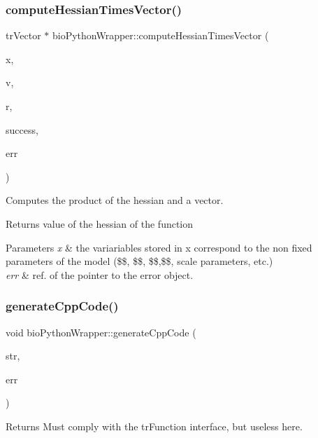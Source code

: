 \subsubsection{\texorpdfstring{compute\+Hessian\+Times\+Vector()}{computeHessianTimesVector()}}
{\footnotesize\ttfamily tr\+Vector $\ast$ bio\+Python\+Wrapper\+::compute\+Hessian\+Times\+Vector (\begin{DoxyParamCaption}\item[{tr\+Vector $\ast$}]{x,  }\item[{const tr\+Vector $\ast$}]{v,  }\item[{tr\+Vector $\ast$}]{r,  }\item[{pat\+Boolean $\ast$}]{success,  }\item[{pat\+Error $\ast$\&}]{err }\end{DoxyParamCaption})}

Computes the product of the hessian and a vector. \begin{DoxyReturn}{Returns}
value of the hessian of the function 
\end{DoxyReturn}

\begin{DoxyParams}{Parameters}
{\em x} & the variariables stored in x correspond to the non fixed parameters of the model (\$\$, \$\$, \$\$,\$\$, scale parameters, etc.) \\
\hline
{\em err} & ref. of the pointer to the error object. \\
\hline
\end{DoxyParams}
\mbox{\label{classbio_python_wrapper_a587445d7da95e667c2332ca43ec00823}} 
\subsubsection{\texorpdfstring{generate\+Cpp\+Code()}{generateCppCode()}}
{\footnotesize\ttfamily void bio\+Python\+Wrapper\+::generate\+Cpp\+Code (\begin{DoxyParamCaption}\item[{ostream \&}]{str,  }\item[{pat\+Error $\ast$\&}]{err }\end{DoxyParamCaption})}

\begin{DoxyReturn}{Returns}
Must comply with the tr\+Function interface, but useless here. 
\end{DoxyReturn}
\mbox{\label{classbio_python_wrapper_ab61446fd399dcf7fbcaf667fa5834097}} 
